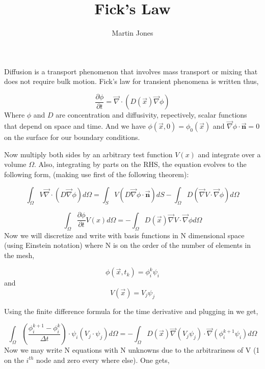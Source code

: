 \documentclass{article}
\begin{document}
\title{Fick's Law}
\date{}
\author{Martin Jones}
\maketitle
\thispagestyle{empty}
Diffusion is a transport phenomenon that involves mass transport or mixing that does not require bulk motion. Fick's law for transient phenomena is written thus,

\begin{equation} 
\frac{\partial \phi}{\partial t} = \vec{\nabla} \cdot (D(\vec{x})\vec{\nabla} \phi)
\end{equation} 
Where $\phi$ and $D$ are concentration and diffusivity, repectively, scalar functions that depend on space and time. And we have $\phi(\vec{x},0)=\phi_{0}(\vec{x})$ and $\vec{\nabla}\phi \cdot \vec{\mathbf{n}}=0$ on the surface for our boundary conditions.

Now multiply both sides by an arbitrary test function $V(x)$ and integrate over a volume $\Omega$. Also, integrating by parts on the RHS, the equation evolves to the following form,  (making use first of the following theorem):

\begin{displaymath}
\int_{\Omega}V\vec{\nabla}\cdot(D\vec{\nabla}\phi)d\Omega=\int_{S}V(D\vec{\nabla}\phi\cdot \vec{\mathbf{n}})dS-\int_{\Omega}D(\vec{\nabla}V\cdot \vec{\nabla} \phi)d\Omega
\end{displaymath}

 \begin{equation} 
\int_{\Omega} \frac{\partial \phi}{\partial t} V(x)d\Omega = -\int_{\Omega}D(\vec{x})\vec{\nabla}V \cdot\vec{\nabla} \phi d\Omega
\end{equation}
Now we will discretize and write with basis functions in N dimensional space (using Einstein notation) where N is on the order of the number of elements in the mesh,

\begin{equation}
\phi (\vec{x},t_{k})=\phi_{i}^{k}\psi_{i}
\end{equation}and
\begin{equation}
V(\vec{x})=V_{j}\psi_{j}
\end{equation}

Using the finite difference formula for the time derivative and plugging in we get,

 \begin{equation} 
\int_{\Omega} \left(\frac{\phi_{i}^{k+1}-\phi_{i}^{k}}{\Delta t}\right)\cdot \psi_{i} (V_{j}\cdot \psi_{j })d\Omega = -\int_{\Omega}D(\vec{x})\vec{\nabla}(V_{j}\psi_{j}) \cdot\vec{\nabla} (\phi_{i}^{k+1}\psi_{i}) d\Omega
\end{equation}
Now we may write N equations with N unknowns due to the arbitrariness of V (1 on the $i^{th}$ node and zero every where else). One gets,
\end{document}
